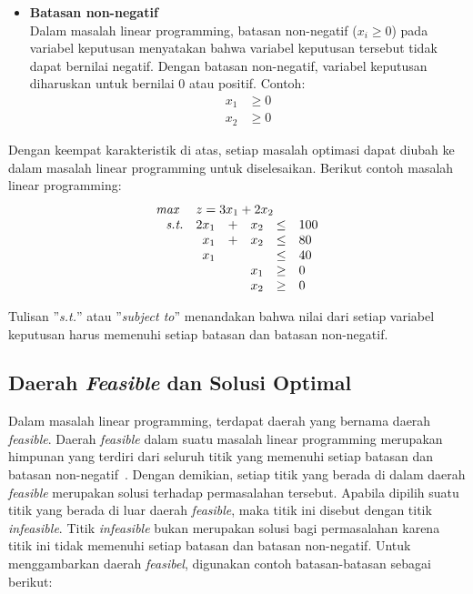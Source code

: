 \begin{itemize}
	\item \textbf{Batasan non-negatif}\\
		Dalam masalah linear programming, batasan non-negatif (\(x_i\geq 0\)) pada variabel keputusan menyatakan bahwa variabel keputusan tersebut tidak dapat bernilai negatif. Dengan batasan non-negatif, variabel keputusan diharuskan untuk bernilai 0 atau positif. Contoh:
		\begin{equation*}
			\begin{split}
    			x_1 &\geq 0 \\
    			x_2 &\geq 0
			\end{split}
		\end{equation*}
		
\end{itemize}

Dengan keempat karakteristik di atas, setiap masalah optimasi dapat diubah ke dalam masalah linear programming untuk diselesaikan. Berikut contoh masalah linear programming:
\begin{equation*}
	\begin{array}{r r c r c l}
		\textit{max } &\multicolumn{5}{l}{z = 3x_1 + 2x_2}\\
		\textit{s.t.} &2x_1 &+ &x_2 &\leq &100\\
		&x_1 &+ &x_2 &\leq &80\\
		&x_1 &&&\leq &40\\
		&&&x_1 &\geq &0\\
		&&&x_2 &\geq &0\\
	\end{array}
\end{equation*}

	Tulisan ''\textit{s.t.}'' atau ''\textit{subject to}'' menandakan bahwa nilai dari setiap variabel keputusan harus memenuhi setiap batasan dan batasan non-negatif.

\subsection{Daerah \textit{Feasible} dan Solusi Optimal}
Dalam masalah linear programming, terdapat daerah yang bernama daerah \textit{feasible}. Daerah \textit{feasible} dalam suatu masalah linear programming merupakan himpunan yang terdiri dari seluruh titik yang memenuhi setiap batasan dan batasan non-negatif~\cite{winston2004operations}. Dengan demikian, setiap titik yang berada di dalam daerah \textit{feasible} merupakan solusi terhadap permasalahan tersebut. Apabila dipilih suatu titik yang berada di luar daerah \textit{feasible}, maka titik ini disebut dengan titik \textit{infeasible}. Titik \textit{infeasible} bukan merupakan solusi bagi permasalahan karena titik ini tidak memenuhi setiap batasan dan batasan non-negatif. Untuk menggambarkan daerah \textit{feasibel}, digunakan contoh batasan-batasan sebagai berikut:

